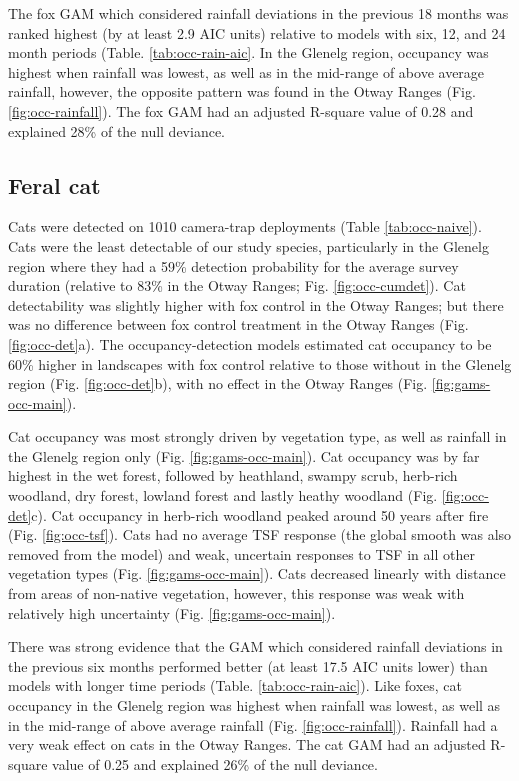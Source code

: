 \documentclass[11pt,a4paper,titlepage,twoside,openright]{style/unimelbthesis}
\begin{document}
\begin{mainmatter}
The fox GAM which considered rainfall deviations in the previous 18 months was ranked highest (by at least 2.9 AIC units) relative to models with six, 12, and 24 month periods (Table. \ref{tab:occ-rain-aic}. In the Glenelg region, occupancy was highest when rainfall was lowest, as well as in the mid-range of above average rainfall, however, the opposite pattern was found in the Otway Ranges (Fig. \ref{fig:occ-rainfall}). The fox GAM had an adjusted R-square value of 0.28 and explained 28\% of the null deviance.

\hypertarget{feral-cat-1}{%
\subsection{Feral cat}\label{feral-cat-1}}

Cats were detected on 1010 camera-trap deployments (Table \ref{tab:occ-naive}). Cats were the least detectable of our study species, particularly in the Glenelg region where they had a 59\% detection probability for the average survey duration (relative to 83\% in the Otway Ranges; Fig. \ref{fig:occ-cumdet}). Cat detectability was slightly higher with fox control in the Otway Ranges; but there was no difference between fox control treatment in the Otway Ranges (Fig. \ref{fig:occ-det}a). The occupancy-detection models estimated cat occupancy to be 60\% higher in landscapes with fox control relative to those without in the Glenelg region (Fig. \ref{fig:occ-det}b), with no effect in the Otway Ranges (Fig. \ref{fig:gams-occ-main}).

Cat occupancy was most strongly driven by vegetation type, as well as rainfall in the Glenelg region only (Fig. \ref{fig:gams-occ-main}). Cat occupancy was by far highest in the wet forest, followed by heathland, swampy scrub, herb-rich woodland, dry forest, lowland forest and lastly heathy woodland (Fig. \ref{fig:occ-det}c). Cat occupancy in herb-rich woodland peaked around 50 years after fire (Fig. \ref{fig:occ-tsf}). Cats had no average TSF response (the global smooth was also removed from the model) and weak, uncertain responses to TSF in all other vegetation types (Fig. \ref{fig:gams-occ-main}). Cats decreased linearly with distance from areas of non-native vegetation, however, this response was weak with relatively high uncertainty (Fig. \ref{fig:gams-occ-main}).

There was strong evidence that the GAM which considered rainfall deviations in the previous six months performed better (at least 17.5 AIC units lower) than models with longer time periods (Table. \ref{tab:occ-rain-aic}). Like foxes, cat occupancy in the Glenelg region was highest when rainfall was lowest, as well as in the mid-range of above average rainfall (Fig. \ref{fig:occ-rainfall}). Rainfall had a very weak effect on cats in the Otway Ranges. The cat GAM had an adjusted R-square value of 0.25 and explained 26\% of the null deviance.


\end{mainmatter}
\end{document}
